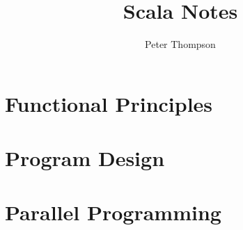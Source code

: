 \documentclass{report}
\title{Scala Notes}
\author{Peter Thompson}
\begin{document}
\maketitle
\tableofcontents
\part{Functional Principles}

\part{Program Design}

\part{Parallel Programming}




\end{document}
